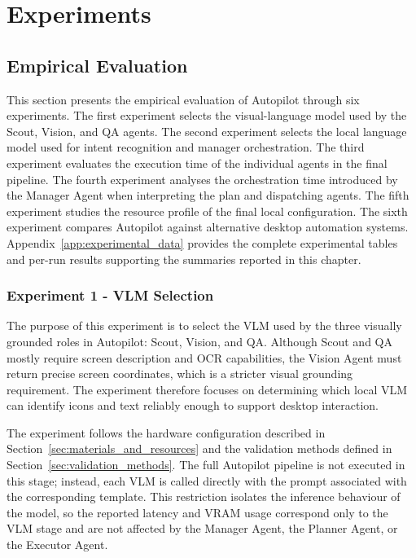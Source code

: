 \chapter{Experiments}
\label{chap:experiments}
\setcounter{section}{0}

\section{Empirical Evaluation}

This section presents the empirical evaluation of Autopilot through six experiments. The first experiment selects the visual-language model used by the Scout, Vision, and QA agents. The second experiment selects the local language model used for intent recognition and manager orchestration. The third experiment evaluates the execution time of the individual agents in the final pipeline. The fourth experiment analyses the orchestration time introduced by the Manager Agent when interpreting the plan and dispatching agents. The fifth experiment studies the resource profile of the final local configuration. The sixth experiment compares Autopilot against alternative desktop automation systems. Appendix~\ref{app:experimental_data} provides the complete experimental tables and per-run results supporting the summaries reported in this chapter.

\subsection{Experiment 1 - VLM Selection}
\label{sec:vlm_selection}
The purpose of this experiment is to select the VLM used by the three visually grounded roles in Autopilot: Scout, Vision, and QA. Although Scout and QA mostly require screen description and OCR capabilities, the Vision Agent must return precise screen coordinates, which is a stricter visual grounding requirement. The experiment therefore focuses on determining which local VLM can identify icons and text reliably enough to support desktop interaction.

The experiment follows the hardware configuration described in Section~\ref{sec:materials_and_resources} and the validation methods defined in Section~\ref{sec:validation_methods}. The full Autopilot pipeline is not executed in this stage; instead, each VLM is called directly with the prompt associated with the corresponding template. This restriction isolates the inference behaviour of the model, so the reported latency and VRAM usage correspond only to the VLM stage and are not affected by the Manager Agent, the Planner Agent, or the Executor Agent.

